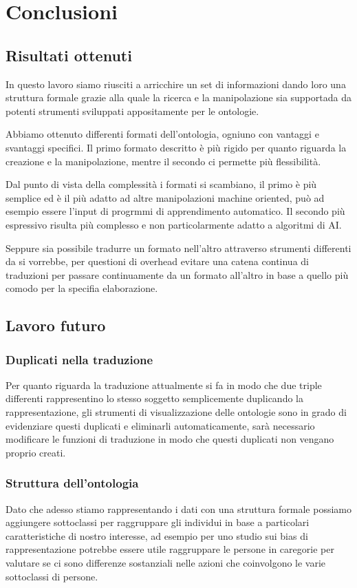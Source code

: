 \section{Conclusioni}
	\subsection{Risultati ottenuti}
	In questo lavoro siamo riusciti a arricchire un set di informazioni dando loro una struttura formale grazie alla quale la ricerca e la manipolazione sia supportada da potenti strumenti sviluppati appositamente per le ontologie. 
	
	Abbiamo ottenuto differenti formati dell'ontologia, ogniuno con vantaggi e svantaggi specifici. Il primo formato descritto è più rigido per quanto riguarda la creazione e la manipolazione, mentre il secondo ci permette più flessibilità.
	
	Dal punto di vista della complessità i formati si scambiano, il primo è più semplice ed è il più adatto ad altre manipolazioni machine oriented, può ad esempio essere l'input di progrmmi di apprendimento automatico. Il secondo più espressivo risulta più complesso e non particolarmente adatto a algoritmi di AI. 
	
	Seppure sia possibile tradurre un formato nell'altro attraverso strumenti differenti da \cduce si vorrebbe, per questioni di overhead evitare una catena continua di traduzioni per passare continuamente da un formato all'altro in base a quello più comodo per la specifia elaborazione.
	\subsection{Lavoro futuro}
		\subsubsection{Duplicati nella traduzione}
			Per quanto riguarda la traduzione attualmente si fa in modo che due triple differenti rappresentino lo stesso soggetto semplicemente duplicando la rappresentazione, gli strumenti di visualizzazione delle ontologie sono in grado di evidenziare questi duplicati e eliminarli automaticamente, sarà necessario modificare le funzioni di traduzione in modo che questi duplicati non vengano proprio creati.
		\subsubsection{Struttura dell'ontologia}
			Dato che adesso stiamo rappresentando i dati con una struttura formale possiamo aggiungere sottoclassi per raggruppare gli individui in base a particolari caratteristiche di nostro interesse, ad esempio per uno studio sui bias di rappresentazione potrebbe essere utile raggruppare le persone in caregorie per valutare se ci sono differenze sostanziali nelle azioni che coinvolgono le varie sottoclassi di persone.
	
	